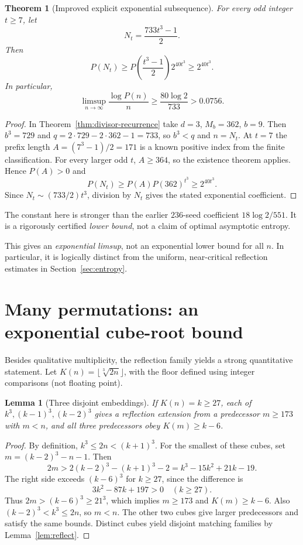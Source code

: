 \documentclass[10pt]{article}
\newtheorem{theorem}{Theorem}
\newtheorem{lemma}{Lemma}
\begin{document}
\begin{theorem}[Improved explicit exponential subsequence]
\label{thm:362subsequence}
For every odd integer $t\ge7$, let
\[
N_t=\frac{733t^3-1}{2}.
\]
Then
\[
\boxed{\displaystyle
P(N_t)\ge
P\!\left(\frac{t^3-1}{2}\right)
2^{40t^3}\ge2^{40t^3}.}
\]
In particular,
\[
\boxed{\displaystyle
\limsup_{n\to\infty}\frac{\log P(n)}n
\ge\frac{80\log2}{733}
>0.0756.}
\]
\end{theorem}
\begin{proof}
In Theorem~\ref{thm:divisor-recurrence}
take $d=3$, $M_b=362$, $b=9$.
Then $b^3=729$ and $q=2\cdot729-2\cdot362-1=733$,
so $b^3<q$ and $n=N_t$.
At $t=7$ the prefix length
$A=(7^3-1)/2=171$ is a known positive
index from the finite classification.
For every larger odd $t$, $A\ge364$,
so the existence theorem applies.
Hence $P(A)>0$ and
\[
P(N_t)\ge P(A)P(362)^{t^3}
\ge2^{40t^3}.
\]
Since $N_t\sim(733/2)t^3$,
division by $N_t$ gives the stated
exponential coefficient.
\end{proof}

The constant here is stronger than
the earlier $236$-seed coefficient
$18\log2/551$. It is a rigorously
certified \emph{lower bound}, not a
claim of optimal asymptotic entropy.

This gives an \emph{exponential limsup},
not an exponential lower bound for all $n$.
In particular, it is logically distinct from
the uniform, near-critical reflection
estimates in Section~\ref{sec:entropy}.

\section{Many permutations: an exponential cube-root bound}
Besides qualitative multiplicity, the reflection family
yields a strong quantitative statement.
Let $K(n)=\lfloor\sqrt[3]{2n}\rfloor$, with the floor
defined using integer comparisons (not floating point).

\begin{lemma}[Three disjoint embeddings]\label{lem:triple}
If $K(n)=k\ge27$, each of
$k^3,(k-1)^3,(k-2)^3$ gives a reflection extension
from a predecessor $m\ge173$ with $m<n$,
and all three predecessors obey $K(m)\ge k-6$.
\end{lemma}
\begin{proof}
By definition, $k^3\le2n<(k+1)^3$.
For the smallest of these cubes, set
$m=(k-2)^3-n-1$. Then
\[
2m>2(k-2)^3-(k+1)^3-2
=k^3-15k^2+21k-19.
\]
The right side exceeds $(k-6)^3$ for $k\ge27$, since
the difference is
\[
3k^2-87k+197>0
\quad (k\ge27).
\]
Thus $2m>(k-6)^3\ge21^3$, which implies
$m\ge173$ and $K(m)\ge k-6$.
Also $(k-2)^3<k^3\le2n$, so $m<n$.
The other two cubes give larger predecessors
and satisfy the same bounds.
Distinct cubes yield disjoint matching families
by Lemma~\ref{lem:reflect}.
\end{proof}
\end{document}
